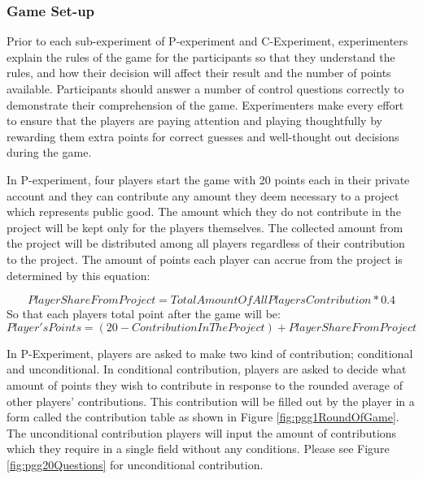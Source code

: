 \subsubsection{Game Set-up}

Prior to each sub-experiment of P-experiment and C-Experiment, experimenters explain the rules of the game for the participants so that they understand the rules, and how their decision will affect their result and the number of points available. Participants should answer a number of control questions correctly to demonstrate their comprehension of the game. Experimenters make every effort to ensure that the players are paying attention and playing thoughtfully by rewarding them extra points for correct guesses and well-thought out decisions during the game.

In P-experiment, four players start the game with 20 points each in their private account and they can contribute any amount they deem necessary to a project which represents public good. The amount which they do not contribute in the project will be kept only for the players themselves. The collected amount from the project will be distributed among all players regardless of their contribution to the project. The amount of points each player can accrue from the project is determined by this equation:

\begin{equation*}
Player Share From Project = Total Amount Of All Players Contribution * 0.4
\end{equation*}
So that each players total point after the game will be:
\begin{equation*}
Player's Points = (20 - Contribution In The Project) + Player Share From Project
\end{equation*}

In P-Experiment, players are asked to make two kind of contribution; conditional and unconditional. In conditional contribution, players are asked to decide what amount of points they wish to contribute in response to the rounded average of other players' contributions. This contribution will be filled out by the player in a form called the contribution table as shown in Figure \ref{fig:pgg1RoundOfGame}. The unconditional contribution players will input the amount of contributions which they require in a single field without any conditions. Please see Figure \ref{fig:pgg20Questions} for unconditional contribution.


